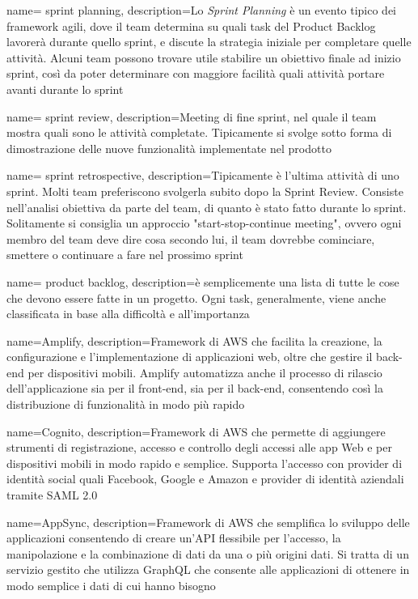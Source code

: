 {
	name= sprint planning,
	description={Lo \emph{Sprint Planning} è un evento tipico dei framework agili, dove il team determina su quali task del Product Backlog lavorerà durante quello sprint, e discute la strategia iniziale per completare quelle attività. Alcuni team possono trovare utile stabilire un obiettivo finale ad inizio sprint, così da poter determinare con maggiore facilità quali attività portare avanti durante lo sprint}
}

{
	name= sprint review,
	description={Meeting di fine sprint, nel quale il team mostra quali sono le attività completate. Tipicamente si svolge sotto forma di dimostrazione delle nuove funzionalità implementate nel prodotto}
}

{
	name= sprint retrospective,
	description={Tipicamente è l'ultima attività di uno sprint. Molti team preferiscono svolgerla subito dopo la Sprint Review. Consiste nell'analisi obiettiva da parte del team, di quanto è stato fatto durante lo sprint. Solitamente si consiglia un approccio "start-stop-continue meeting", ovvero ogni membro del team deve dire cosa secondo lui, il team dovrebbe cominciare, smettere o continuare a fare nel prossimo sprint}
}

{
	name= product backlog,
	description={è semplicemente una lista di tutte le cose che devono essere fatte in un progetto. Ogni task, generalmente, viene anche classificata in base alla difficoltà e all'importanza}
}

{
	name=Amplify,
	description={Framework di AWS che facilita la creazione, la configurazione e l’implementazione di applicazioni web, oltre che gestire il back-end per dispositivi mobili. Amplify automatizza anche il processo di rilascio dell’applicazione sia per il front-end, sia per il back-end, consentendo così la distribuzione di funzionalità in modo più rapido}
}

{
	name=Cognito,
	description={Framework di AWS che permette di aggiungere strumenti di registrazione, accesso e controllo degli accessi alle app Web e per dispositivi mobili in modo rapido e semplice. Supporta l'accesso con provider di identità social quali Facebook, Google e Amazon e provider di identità aziendali tramite SAML 2.0}
}

{
	name=AppSync,
	description={Framework di AWS che semplifica lo sviluppo delle applicazioni consentendo di creare un'API flessibile per l’accesso, la manipolazione e la combinazione di dati da una o più origini dati. Si tratta di un servizio gestito che utilizza GraphQL che consente alle applicazioni di ottenere in modo semplice i dati di cui hanno bisogno}
}